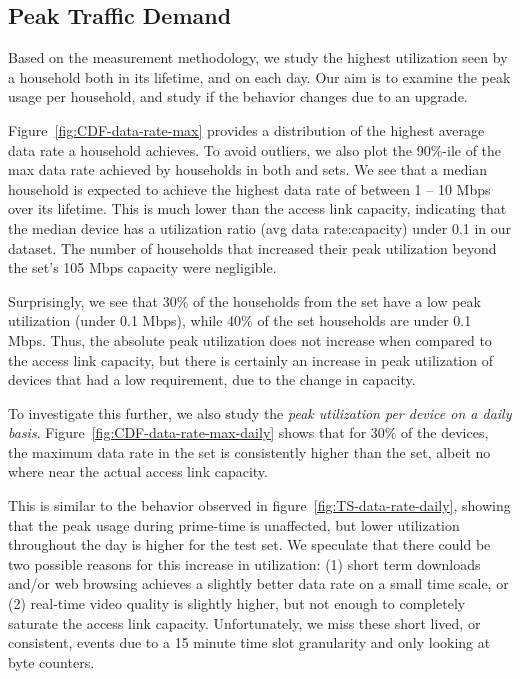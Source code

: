 \subsection{Peak Traffic Demand}\label{subsec:peakratio}





Based on the measurement methodology, we study the highest utilization seen by a 
household
both in its lifetime, and on each day. Our aim is to examine the peak usage per 
household, and
study if the behavior changes due to an upgrade.

Figure~\ref{fig:CDF-data-rate-max} provides a distribution of the highest 
average
data rate a household achieves. To avoid outliers, we also plot the 90\%-ile of 
the max
data rate achieved by households in both \test and \control sets. We see that a 
median
household is expected to achieve the highest data rate of between 1 -- 10 Mbps 
over its
lifetime. This is much lower than the access link capacity,
indicating that the median device has a utilization ratio (avg data 
rate:capacity) under
0.1 in our dataset. The number of households that increased their peak 
utilization beyond
the \control set's 105 Mbps capacity were negligible.

Surprisingly, we see that 30\% of the households from the \test set have a low 
peak
utilization (under 0.1 Mbps), while 40\% of the \control set households are 
under 0.1 Mbps.
Thus, the absolute peak utilization does not increase when compared to the 
access link
capacity, but there is certainly an increase in peak utilization of devices that 
had a low
requirement, due to the change in capacity.

To investigate this further, we also study the \emph{peak utilization per device 
on a daily basis}.
Figure~\ref{fig:CDF-data-rate-max-daily} shows that for 30\% of the devices,
the maximum data rate in the \test set is consistently higher than the \control 
set, albeit
no where near the actual access link capacity.

This is similar to the behavior observed in figure~\ref{fig:TS-data-rate-daily}, 
showing that the peak
usage during prime-time is unaffected, but lower utilization throughout the day 
is higher
for the test set. We speculate that there could be two possible reasons for this 
increase
in utilization: (1) short term downloads and/or web browsing achieves a slightly 
better
data rate on a small time scale, or (2) real-time video quality is slightly 
higher, but
not enough to completely saturate the access link capacity. Unfortunately, we 
miss these
short lived, or consistent, events due to a 15 minute time slot granularity and 
only
looking at byte counters.



